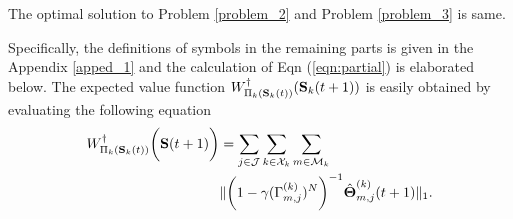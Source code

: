 \begin{lemma}[]
    The optimal solution to Problem \ref{problem_2} and Problem \ref{problem_3} is same.
\end{lemma}


Specifically, the definitions of symbols in the remaining parts is given in the Appendix \ref{apped_1} and the calculation of Eqn (\ref{eqn:partial}) is elaborated below.
The expected value function $W^{\dagger}_{\Pi_{k}(\mathbf{S}_{k}(t))}(\mathbf{S}_{k}(t+1))$ is easily obtained by evaluating the following equation
\begin{align}
    W^{\dagger}_{\Pi_{k}(\mathbf{S}_{k}(t))}\bigg(\mathbf{S}(t+1)\bigg) &= \sum_{j\in\mathcal{J}}\sum_{k\in\mathcal{X}_{k}}\sum_{m\in\mathcal{M}_{k}}
    \nonumber\\
    &\lVert
        \bigg( 1 - \gamma ({\Gamma}^{(k)}_{m,j})^{N} \bigg)^{-1} \hat{\boldsymbol{\Theta}}^{(k)}_{m,j}(t+1)
    \|_1.
    \label{w_ap}
\end{align}

